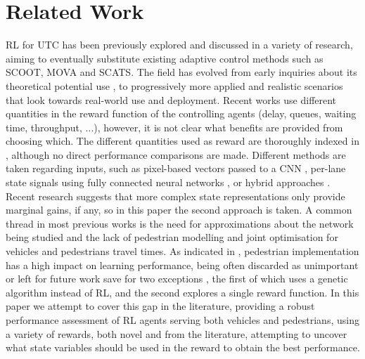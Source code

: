 \documentclass[a4paper, conference]{IEEEtran}
\begin{document}
\section{Related Work}
\label{lit}
RL for UTC has been previously explored and discussed in a variety of research, aiming to eventually substitute existing adaptive control methods such as SCOOT\cite{scoot}, MOVA\cite{mova} and SCATS\cite{scats}.
The field has evolved from early inquiries about its theoretical potential use \cite{wiering2000} \cite{abdul2003} \cite{pra2010} \cite{abdulhai2010} \cite{abdoos2011}, to progressively more applied and realistic scenarios that look towards real-world use and deployment.
Recent works use different quantities in the reward function of the controlling agents (delay, queues, waiting time, throughput, ...), however, it is not clear what benefits are provided from choosing which.
The different quantities used as reward are thoroughly indexed in \cite{yau} \cite{survey2020} \cite{survey2020wei}, although no direct performance comparisons are made.
Different methods are taken regarding inputs, such as pixel-based vectors passed to a CNN \cite{liang2017} \cite{gao2017} \cite{mousavi2017}, per-lane state signals using fully connected neural networks \cite{survey2014} \cite{aslani2019} \cite{genders2019}, or hybrid approaches \cite{genders2016} \cite{gendersthesis} \cite{wan2018}.
Recent research suggests that more complex state representations only provide marginal gains, if any\cite{gendersstate}, so in this paper the second approach is taken.
A common thread in most previous works is the need for approximations about the network being studied and the lack of pedestrian modelling and joint optimisation for vehicles and pedestrians travel times.
As indicated in \cite{survey2020}, pedestrian implementation has a high impact on learning performance, being often discarded as unimportant or left for future work save for two exceptions \cite{geneticped} \cite{liu2017}, the first of which uses a genetic algorithm instead of RL, and the second explores a single reward function.
In this paper we attempt to cover this gap in the literature, providing a robust performance assessment of RL agents serving both vehicles and pedestrians, using a variety of rewards, both novel and from the literature, attempting to uncover what state variables should be used in the reward to obtain the best performance.
\end{document}
